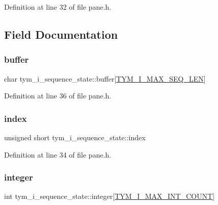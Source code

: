 Definition at line 32 of file pane.\+h.



\subsection{Field Documentation}
\mbox{\label{structtym__i__sequence__state_a782d1f5d5590a0c339657a6a7ee7679a}} 
\subsubsection{\texorpdfstring{buffer}{buffer}}
{\footnotesize\ttfamily char tym\+\_\+i\+\_\+sequence\+\_\+state\+::buffer\mbox{[}\hyperlink{pane_8h_a726ca809ffd3d67ab4b8476646f26635ac35729e5f4e19e4337cbf8691369ae11}{T\+Y\+M\+\_\+\+I\+\_\+\+M\+A\+X\+\_\+\+S\+E\+Q\+\_\+\+L\+EN}\mbox{]}}



Definition at line 36 of file pane.\+h.

\mbox{\label{structtym__i__sequence__state_a42f86532736babdf8955f997ffc2a4be}} 
\subsubsection{\texorpdfstring{index}{index}}
{\footnotesize\ttfamily unsigned short tym\+\_\+i\+\_\+sequence\+\_\+state\+::index}



Definition at line 34 of file pane.\+h.

\mbox{\label{structtym__i__sequence__state_a4faa974740f6d54f73dc138db2d2bbae}} 
\subsubsection{\texorpdfstring{integer}{integer}}
{\footnotesize\ttfamily int tym\+\_\+i\+\_\+sequence\+\_\+state\+::integer\mbox{[}\hyperlink{pane_8h_a726ca809ffd3d67ab4b8476646f26635a084f298d7fdbb074cc4551357c23d567}{T\+Y\+M\+\_\+\+I\+\_\+\+M\+A\+X\+\_\+\+I\+N\+T\+\_\+\+C\+O\+U\+NT}\mbox{]}}




